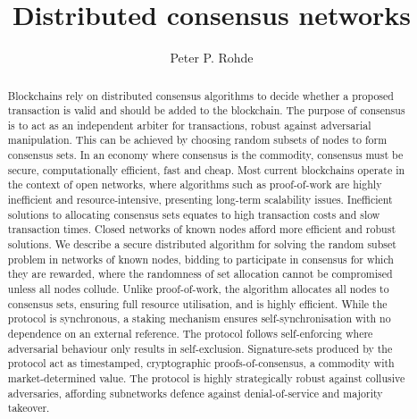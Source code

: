 \documentclass[twocolumn, aps, amsmath, amssymb, nofootinbib, superscriptaddress, longbibliography, floatfix, eqsecnum, rmp]{revtex4-2}
\begin{document}
\title{Distributed consensus networks}

\author{Peter P. Rohde}

\begin{abstract}
Blockchains rely on distributed consensus algorithms to decide whether a proposed transaction is valid and should be added to the blockchain. The purpose of consensus is to act as an independent arbiter for transactions, robust against adversarial manipulation. This can be achieved by choosing random subsets of nodes to form consensus sets. In an economy where consensus is the commodity, consensus must be secure, computationally efficient, fast and cheap. Most current blockchains operate in the context of open networks, where algorithms such as proof-of-work are highly inefficient and resource-intensive, presenting long-term scalability issues. Inefficient solutions to allocating consensus sets equates to high transaction costs and slow transaction times. Closed networks of known nodes afford more efficient and robust solutions. We describe a secure distributed algorithm for solving the random subset problem in networks of known nodes, bidding to participate in consensus for which they are rewarded, where the randomness of set allocation cannot be compromised unless all nodes collude. Unlike proof-of-work, the algorithm allocates all nodes to consensus sets, ensuring full resource utilisation, and is highly efficient. While the protocol is synchronous, a staking mechanism ensures self-synchronisation with no dependence on an external reference. The protocol follows self-enforcing where adversarial behaviour only results in self-exclusion. Signature-sets produced by the protocol act as timestamped, cryptographic proofs-of-consensus, a commodity with market-determined value. The protocol is highly strategically robust against collusive adversaries, affording subnetworks defence against denial-of-service and majority takeover.
\end{abstract}

\maketitle
\end{document}
